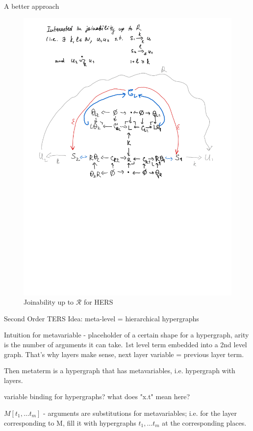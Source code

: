\documentclass{article}
\theoremstyle{plain}
\theoremstyle{definition}
\begin{document}
\begin{section}{A better approach}
\begin{figure}[H]
\hspace{-1.0cm}
\includegraphics[scale=0.8]{images/joinuptor.png}
\caption{Joinability up to $\mathcal{R}$ for HERS}
\end{figure}

\begin{subsection}{Second Order TERS}
Idea: meta-level = hierarchical hypergraphs

Intuition for metavariable - placeholder of a certain shape for a hypergraph, arity is the number of arguments it can take. 1st level term embedded into a 2nd level graph. That's why layers make sense, next layer variable = previous layer term.

Then metaterm is a hypergraph that has metavariables, i.e. hypergraph with layers. 

{\color{red} variable binding for hypergraphs? what does "x.t" mean here?}

$M[t_1, \dots t_m]$ - arguments are substitutions for metavariables; i.e. for the layer corresponding to M, fill it with hypergraphs $t_1, \dots t_m$ at the corresponding places.



\end{subsection}
\end{section}
\end{document}
